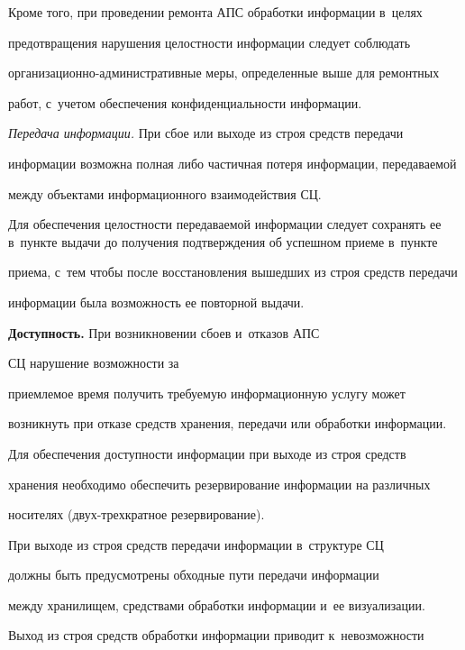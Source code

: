   

  Кроме того, при проведении ремонта АПС обработки информации в~целях 

предотвращения нарушения целостности информации следует соблюдать 

ор\-га\-ни\-за\-ци\-он\-но-ад\-ми\-ни\-ст\-ра\-тив\-ные меры, определенные выше для ремонтных 

работ, с~учетом обеспечения конфиденциальности информации.

  

  \textit{Передача информации.} При сбое или выходе из строя средств передачи 

информации возможна полная либо частичная потеря информации, передаваемой 

между объектами информационного взаимодействия СЦ.

  

  Для обеспечения целостности передаваемой информации следует сохранять ее в~пункте выдачи до получения подтверждения об успешном приеме в~пункте 

приема, с~тем чтобы после восстановления вышедших из строя средств передачи 

информации была возможность ее повторной выдачи.

  

\textbf{Доступность.} При возникновении сбоев и~отказов АПС

   СЦ нарушение возможности за 

приемлемое время получить требуемую информационную услугу может 

возникнуть при отказе средств хранения, передачи или обработки информации.

  

  Для обеспечения доступности информации при выходе из строя средств 

хранения необходимо обеспечить резервирование информации на различных 

носителях (двух-трех\-крат\-ное резервирование).

  

  При выходе из строя средств передачи информации в~структуре СЦ

   должны быть предусмотрены обходные пути передачи информации 

между хранилищем, средствами обработки информации и~ее визуализации.

  

  Выход из строя средств обработки информации приводит к~невозможности 

